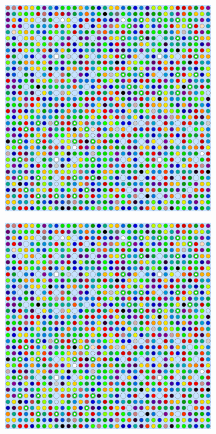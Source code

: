 \documentclass[12pt,twoside]{mitthesis-exec}
\begin{document}
\begin{figure}[h!]
\centering
\begin{subfigure}{0.47\textwidth}
  \centering
  \includegraphics[width=0.7\linewidth]{figures/quantification/homogenization/2x2-degenerate-materials}
  \caption{}
  \label{fig:2x2-degenerate}
\end{subfigure}%
\begin{subfigure}{0.47\textwidth}
  \centering
  \includegraphics[width=0.7\linewidth]{figures/quantification/homogenization/2x2-degenerate-materials}
  \caption{}
  \label{fig:reflector-degenerate}
\end{subfigure}
\begin{subfigure}{0.47\textwidth}
  \centering

\end{subfigure}
\end{figure}
\end{document}
